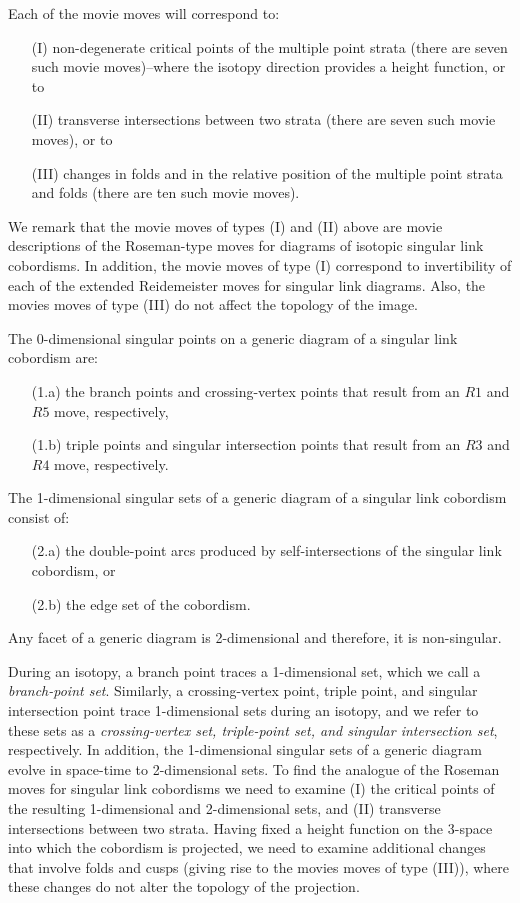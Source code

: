 \documentclass{amsart}\usepackage{amsfonts, amsmath, amssymb}\usepackage{graphicx, epic, epsf, enumerate, stmaryrd}
\theoremstyle{definition}
\numberwithin{equation}{section}
\begin{document}
Each of the movie moves will correspond to:
\begin{enumerate}
\item[(I)] non-degenerate critical points of the multiple point strata (there are seven such movie moves)--where the isotopy direction provides a height function, or to  
\item[(II)] transverse intersections between two strata (there are seven such movie moves), or to 
\item[(III)] changes in folds and in the relative position of the multiple point strata and folds (there are ten such movie moves). 
\end{enumerate}

We remark that the movie moves of types (I) and (II) above are movie descriptions of the Roseman-type moves for diagrams of isotopic singular link cobordisms. In addition, the movie moves of type (I) correspond to invertibility of each of the extended Reidemeister moves for singular link diagrams. Also, the movies moves of type (III) do not affect the topology of the image.

The 0-dimensional singular points on a generic diagram of a singular link cobordism are: 
\begin{enumerate}
\item[(1.a)] the branch points and crossing-vertex points that result from an $R1$ and $R5$ move, respectively,
\item[(1.b)] triple points and singular intersection points that result from an $R3$ and $R4$ move, respectively.
\end{enumerate}

The 1-dimensional singular sets of a generic diagram of a singular link cobordism consist of: 
\begin{enumerate}
\item[(2.a)] the double-point arcs produced by self-intersections of the singular link cobordism, or
\item[(2.b)] the edge set of the cobordism.
\end{enumerate}
Any facet of a generic diagram is 2-dimensional and therefore, it is non-singular.

During an isotopy, a branch point traces a 1-dimensional set, which we call a \textit{branch-point set}. Similarly, a crossing-vertex point, triple point, and singular intersection point trace 1-dimensional sets during an isotopy, and we refer to these sets as a \textit{crossing-vertex set, triple-point set, and singular intersection set}, respectively. In addition, the 1-dimensional singular sets of a generic diagram evolve in space-time to 2-dimensional sets. To find the analogue of the Roseman moves for singular link cobordisms we need to examine (I) the critical points of the resulting 1-dimensional and 2-dimensional sets, and (II) transverse intersections between two strata. Having fixed a height function on the 3-space into which the cobordism is projected, we need to examine additional changes that  involve folds and cusps (giving rise to the movies moves of type (III)), where these changes do not alter the topology of the projection. 
\end{document}
